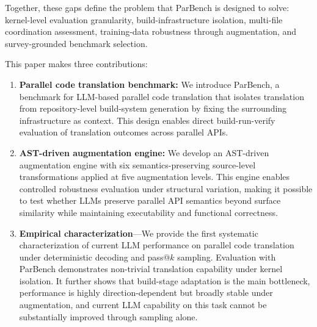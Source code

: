 Together, these gaps define the problem that ParBench is designed to solve: kernel-level evaluation granularity, build-infrastructure isolation, multi-file coordination assessment, training-data robustness through augmentation, and survey-grounded benchmark selection.

This paper makes three contributions:

\begin{enumerate}

\item \textbf{Parallel code translation benchmark:} We introduce ParBench, a benchmark for LLM-based parallel code translation that isolates translation from repository-level build-system generation by fixing the surrounding infrastructure as context. This design enables direct build-run-verify evaluation of translation outcomes across parallel APIs.

\item \textbf{AST-driven augmentation engine:} We develop an AST-driven augmentation engine with six semantics-preserving source-level transformations applied at five augmentation levels. This engine enables controlled robustness evaluation under structural variation, making it possible to test whether LLMs preserve parallel API semantics beyond surface similarity while maintaining executability and functional correctness.


\item \textbf{Empirical characterization}---We provide the first systematic characterization of current LLM performance on parallel code translation under deterministic decoding and pass@$k$ sampling. Evaluation with ParBench demonstrates non-trivial translation capability under kernel isolation. It further shows that build-stage adaptation is the main bottleneck, performance is highly direction-dependent but broadly stable under augmentation, and current LLM capability on this task cannot be substantially improved through sampling alone.
\end{enumerate}



